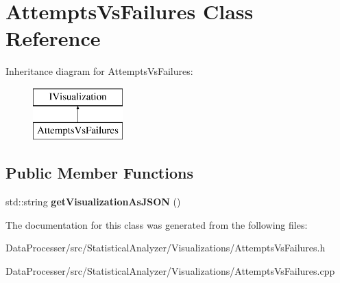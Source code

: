 \hypertarget{classAttemptsVsFailures}{}\section{Attempts\+Vs\+Failures Class Reference}
\label{classAttemptsVsFailures}
Inheritance diagram for Attempts\+Vs\+Failures\+:\begin{figure}[H]
\begin{center}
\leavevmode
\includegraphics[height=2.000000cm]{classAttemptsVsFailures}
\end{center}
\end{figure}
\subsection*{Public Member Functions}
\begin{DoxyCompactItemize}
\item 
\mbox{\label{classAttemptsVsFailures_ac8d34f57c579c66e96fc5d5a83397c5f}} 
std\+::string {\bfseries get\+Visualization\+As\+J\+S\+ON} ()
\end{DoxyCompactItemize}


The documentation for this class was generated from the following files\+:\begin{DoxyCompactItemize}
\item 
Data\+Processer/src/\+Statistical\+Analyzer/\+Visualizations/Attempts\+Vs\+Failures.\+h\item 
Data\+Processer/src/\+Statistical\+Analyzer/\+Visualizations/Attempts\+Vs\+Failures.\+cpp\end{DoxyCompactItemize}
